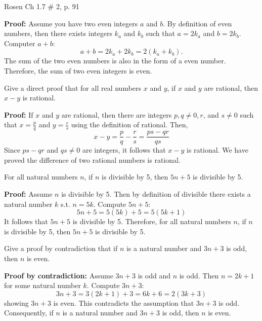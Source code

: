 \documentclass[12pt,addpoints]{exam}
\begin{document}
\begin{questions}
\question Rosen Ch 1.7 \# 2, p. 91
    \ifprintanswers
        \vspace{-10pt}
    \fi
\begin{solution} \textbf{Proof:} Assume you have two even integers $a$ and $b$.  By definition of even numbers, then there exists integers $k_a$ and $k_b$ such that $a=2k_a$ and $b=2k_b$.  Computer $a+b$:
    $$a+b = 2k_a + 2k_b = 2(k_a + k_b).$$
    The sum of the two even numbers is also in the form of a even number.
    Therefore, the sum of two even integers is even.
\end{solution}


\question Give a direct proof that for all real numbers $x$ and $y$,
if $x$ and $y$ are rational, then $x-y$ is rational.
    \ifprintanswers
        \vspace{-10pt}
    \fi
\begin{solution} \textbf{Proof:} If $x$ and $y$ are rational, then there are
    integers $p, q\neq 0, r$, and $s\neq 0$ such that
    $x = \frac{p}{q}$ and $y = \frac{r}{s}$ using the definition of rational.  Then,
    \[ x - y = \frac{p}{q} - \frac{r}{s} = \frac{ps - qr}{qs} \]
    Since $ps - qr$ and $qs \neq 0$ are integers, it follows
    that $x - y$ is rational.  We have proved the difference of
    two rational numbers is rational.
\end{solution}


\question For all natural numbers $n$, if $n$ is divisible by 5,
then $5n+5$ is divisible by 5.
    \ifprintanswers
        \vspace{-10pt}
    \fi
\begin{solution} \textbf{Proof:} Assume $n$ is divisible by 5.
    Then by definition of divisible there exists a natural number
    $k$ s.t. $n=5k$. Compute $5n+5$:
    \[ 5n + 5 = 5(5k) + 5 = 5(5k + 1) \]
    It follows that $5n+5$ is divisible by 5. Therefore, for all
    natural numbers $n$, if $n$ is divisible by 5, then $5n+5$ is
    divisible by 5.
\end{solution}


\question Give a proof by contradiction that if $n$ is a natural
number and $3n+3$ is odd, then $n$ is even.
    \ifprintanswers
        \vspace{-10pt}
    \fi
\begin{solution}
    \textbf{Proof by contradiction:} Assume $3n+3$ is odd and $n$ is
    odd.  Then $n=2k + 1$ for some natural number $k$.  Compute
    $3n+3$:
    \[ 3n + 3 = 3(2k+1) + 3 = 6k + 6 = 2(3k + 3)\]
    showing $3n+3$ is even. This contradicts the assumption that $3n
    + 3$ is odd. Consequently, if $n$ is a natural number and $3n + 3$ is odd, then $n$ is even.
\end{solution}



\end{questions}
\end{document}
